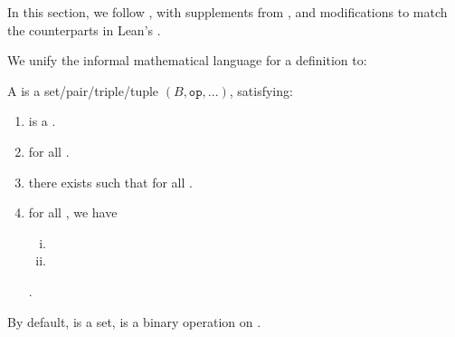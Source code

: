 
In this section, we follow \cite{jadczyk2019notes}, with supplements from \cite{garling2011clifford, chen2016infinitely}, 
and modifications to match the counterparts in Lean's \Mathlib.

\begin{remark}
\label{mk:Informal}

We unify the informal mathematical language for a definition to:

A  is a set/pair/triple/tuple $(B, \mathtt{op}, ...)$, satisfying:

\begin{enumerate}
    \item {} is a  .

    \item {} for all  .
    
    \item {}
    there exists  such that
     for all .

    \item {}for all , we have

        \begin{enumerate}[(i)]

        \item {}
        \item {}
        
        \end{enumerate}

        .

\end{enumerate}

By default,  is a set,  is a binary operation on .

\end{remark}

